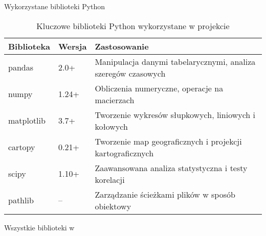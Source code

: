 \begin{frame}{Wykorzystane biblioteki Python}

    \begin{table}

        \begin{tabularx}{\textwidth}{l l >{\raggedright\arraybackslash}X}
            \toprule
            \textbf{Biblioteka} & \textbf{Wersja} & \textbf{Zastosowanie} \\
            \midrule
            pandas & 2.0+ & Manipulacja danymi tabelarycznymi, analiza szeregów czasowych \\
            numpy & 1.24+ & Obliczenia numeryczne, operacje na macierzach \\
            matplotlib & 3.7+ & Tworzenie wykresów słupkowych, liniowych i kołowych \\
            cartopy & 0.21+ & Tworzenie map geograficznych i projekcji kartograficznych \\
            scipy & 1.10+ & Zaawansowana analiza statystyczna i testy korelacji \\
            pathlib & -- & Zarządzanie ścieżkami plików w sposób obiektowy \\
            \bottomrule
        \end{tabularx}
        \caption{Kluczowe biblioteki Python wykorzystane w projekcie}
    \end{table}
Wszystkie biblioteki w 
\end{frame}


